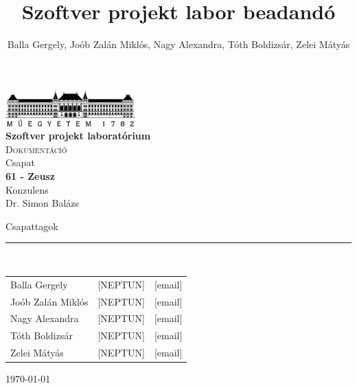 \documentclass[12pt, a4paper]{book}
\title{Szoftver projekt labor beadandó}
\author{Balla Gergely, Joób Zalán Miklós, Nagy Alexandra, Tóth Boldizsár, Zelei Mátyás}
\begin{document}
\begin{titlepage} 
	\begin{center}
		\includegraphics[width=5cm]{img/BMElogo}\\ 
		\vspace{1cm}
		\LARGE{\bfseries{Szoftver projekt laboratórium}}\\
		\vspace{0.5cm}
		\Large\textsc{Dokumentáció}\\
		\vspace{1cm}
		\small{Csapat}\\
		\Large{\bfseries{61 - Zeusz}}\\
		\vspace{1cm}
		\small{Konzulens}\\
		\Large{Dr. Simon Balázs}
	\end{center}
	\begin{flushleft}
		\vspace*{6cm}
		Csapattagok\\
		\vspace{-0.3cm}
		\rule{14cm}{0.5pt}\\
		\vspace{0.2cm}
		\begin{tabular}{l l l} %
			Balla Gergely & [NEPTUN] & [email] \\
			Joób Zalán Miklós & [NEPTUN] & [email] \\
			Nagy Alexandra & [NEPTUN] & [email] \\
			Tóth Boldizsár  & [NEPTUN] & [email] \\
			Zelei Mátyás & [NEPTUN] & [email] \\
		\end{tabular}
	\end{flushleft}
	\begin{flushright}
		\vspace*{2cm}
		\today   %
	\end{flushright}
\end{titlepage}

\sloppy


\tableofcontents
\end{document}
